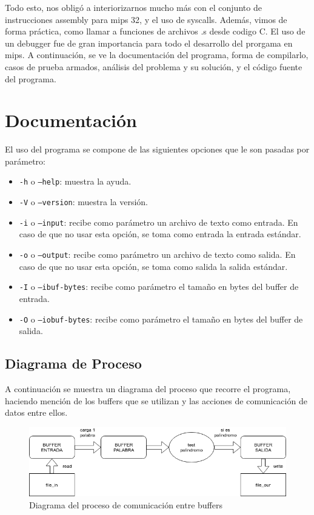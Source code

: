 \documentclass[11pt,a4paper]{article}
\begin{document}
Todo esto, nos obligó a interiorizarnos mucho más con el conjunto de instrucciones assembly para mips 32, y el uso de syscalls. Además, vimos de forma práctica, como llamar a funciones de archivos .s desde codigo C. El uso de un debugger fue de gran importancia para todo el desarrollo del prorgama en mips.
A continuación, se ve la documentación del programa, forma de compilarlo, casos de prueba armados, análisis del problema y su solución, y el código fuente del programa.

\section{Documentación}
El uso del programa se compone de las siguientes opciones que le son pasadas por parámetro:
\begin{itemize}
	\item \texttt{-h} o \texttt{--help}: muestra la ayuda.
	\item \texttt{-V} o \texttt{--version}: muestra la versión.
	\item \texttt{-i} o \texttt{--input}: recibe como parámetro un archivo de texto como entrada. En caso de que no usar esta opción, se toma como entrada la entrada estándar.
	\item \texttt{-o} o \texttt{--output}: recibe como parámetro un archivo de texto como salida. En caso de que no usar esta opción, se toma como salida la salida estándar.
	\item \texttt{-I} o \texttt{--ibuf-bytes}: recibe como parámetro el tamaño en bytes del buffer de entrada.
	\item \texttt{-O} o \texttt{--iobuf-bytes}: recibe como parámetro el tamaño en bytes del buffer de salida.
	
\end{itemize}

\subsection{Diagrama de Proceso}
A continuación se muestra un diagrama del proceso que recorre el programa, haciendo mención de los buffers que se utilizan y las acciones de comunicación de datos entre ellos.

\begin{figure}[H]
	\centering	
	\includegraphics[width=\textwidth]{diagra_proceso}
	\caption{Diagrama del proceso de comunicación entre buffers}
\end{figure}
\end{document}
